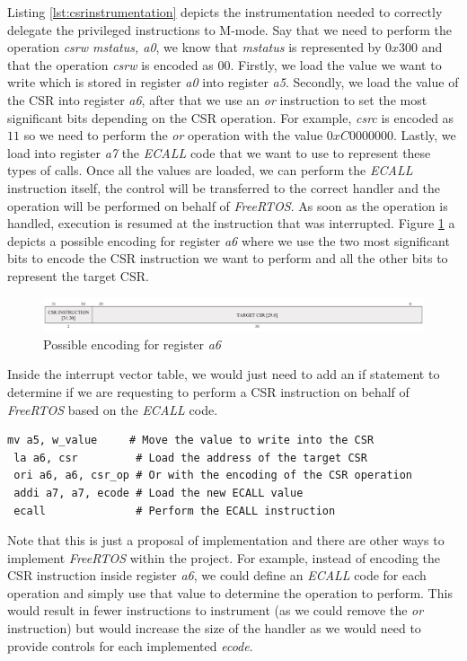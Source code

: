 Listing \ref{lst:csrinstrumentation} depicts the instrumentation needed to
correctly delegate the privileged instructions to M-mode. Say that we need to perform
the operation \textit{csrw mstatus, a0}, we know that \textit{mstatus} is
represented by $0x300$ and that the operation \textit{csrw} is encoded as $00$.
Firstly, we load the value we want to write which is stored in register \textit{a0}
into register \textit{a5}. Secondly, we load the value of the CSR into register \textit{a6},
after that we use an \textit{or} instruction to set the most significant bits
depending on the CSR operation. For example, \textit{csrc} is encoded as $11$ so
we need to perform the \textit{or} operation with the value $0xC0000000$. Lastly,
we load into register \textit{a7} the \textit{ECALL} code that we want to use to
represent these types of calls. Once all the values are loaded, we can perform
the \textit{ECALL} instruction itself, the control will be transferred to the
correct handler and the operation will be performed on behalf of \textit{FreeRTOS}.
As soon as the operation is handled, execution is resumed at the instruction that
was interrupted. Figure \ref{fig:a6encoding} a depicts a possible encoding for
register \textit{a6} where we use the two most significant bits to encode the CSR
instruction we want to perform and all the other bits to represent the target CSR.
\\
\begin{figure}[htbp]
  \centering
  \includegraphics[width=.9\linewidth]{images/freertos_encoding.png}
  \caption{Possible encoding for register \textit{a6}}
  \label{fig:a6encoding}
\end{figure}

Inside the interrupt vector table, we would just need to add an if statement to
determine if we are requesting to perform a CSR instruction on behalf of \textit{FreeRTOS}
based on the \textit{ECALL} code. \\ \begin{lstlisting}[style=Assembly, caption = \textit{FreeRTOS} instrumentation for Control and Status Register operations, label={lst:csrinstrumentation}]
 mv a5, w_value     # Move the value to write into the CSR
 la a6, csr         # Load the address of the target CSR
 ori a6, a6, csr_op # Or with the encoding of the CSR operation
 addi a7, a7, ecode # Load the new ECALL value
 ecall              # Perform the ECALL instruction
\end{lstlisting}

Note that this is just a proposal of implementation and there are other ways to
implement \textit{FreeRTOS} within the project. For example, instead of encoding
the CSR instruction inside register \textit{a6}, we could define an \textit{ECALL}
code for each operation and simply use that value to determine the operation to
perform. This would result in fewer instructions to instrument (as we could
remove the \textit{or} instruction) but would increase the size of the handler
as we would need to provide controls for each implemented \textit{ecode}.
